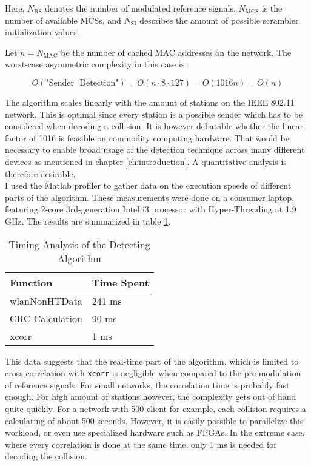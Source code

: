 Here, $ N_{\text{RS}} $ denotes the number of modulated reference signals, $ N_{\text{MCS}} $ is the number of available \glspl{MCS}, and $ N_{\text{SI}} $ describes the amount of possible scrambler initialization values.

Let $ n = N_{\text{MAC}} $ be the number of cached \gls{MAC} addresses on the network. The worst-case asymmetric complexity in this case is:

$$ O(\text{"Sender ~Detection"}) = O(n \cdot 8 \cdot 127) = O(1016 n) = O(n) $$\vspace{0cm}

The algorithm scales linearly with the amount of stations on the IEEE 802.11 network. This is optimal since every station is a possible sender which has to be considered when decoding a collision. It is however debatable whether the linear factor of 1016 is feasible on commodity computing hardware. That would be necessary to enable broad usage of the detection technique across many different devices as mentioned in chapter \ref{ch:introduction}. A quantitative analysis is therefore desirable.\\

I used the Matlab profiler to gather data on the execution speeds of different parts of the algorithm. These measurements were done on a consumer laptop, featuring 2-core 3rd-generation Intel i3 processor with Hyper-Threading at 1.9 GHz. The results are summarized in table \ref{tbl:timing}.

\begin{table}[ht]
	\centering
	\begin{tabular}{|p{8.5cm}|p{2.5cm}|}
		\hline
		\textbf{Function} & \textbf{Time Spent} \\ \hline
    wlanNonHTData & 241 ms \\ \hline
    CRC Calculation & 90 ms \\ \hline
		xcorr & 1 ms \\ \hline
	\end{tabular}
	\caption{Timing Analysis of the Detecting Algorithm \label{tbl:timing}}
\end{table}

This data suggests that the real-time part of the algorithm, which is limited to cross-correlation with \texttt{xcorr} is negligible when compared to the pre-modulation of reference signals. For small networks, the correlation time is probably fast enough. For high amount of stations however, the complexity gets out of hand quite quickly. For a network with 500 client for example, each collision requires a calculating of about 500 seconds. However, it is easily possible to parallelize this workload, or even use specialized hardware such as \glspl{FPGA}. In the extreme case, where every correlation is done at the same time, only 1 ms is needed for decoding the collision.

